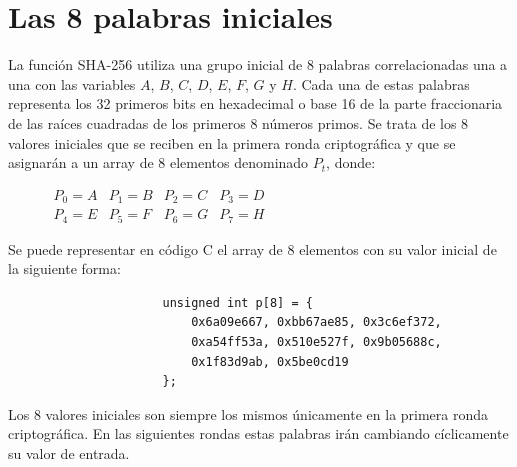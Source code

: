 \documentclass{article}
\begin{document}
\section{Las 8 palabras iniciales}
    La función SHA-256 utiliza una grupo inicial de 8 palabras correlacionadas una a una con las variables $A$, $B$, $C$, $D$, $E$, $F$, $G$ y $H$. Cada una de estas palabras representa los 32 primeros bits en hexadecimal o base 16 de la parte fraccionaria de las raíces cuadradas de los primeros 8 números primos. Se trata de los 8 valores iniciales que se reciben en la primera ronda criptográfica y que se asignarán a un array de 8 elementos denominado $P_{t}$, donde:
        \begin{figure}[H]
        \centering
            $\begin{array}{llll}
                P_{0} = A & P_{1} = B & P_{2} = C & P_{3} = D \\
                P_{4} = E & P_{5} = F & P_{6} = G & P_{7} = H
            \end{array}$
        \end{figure}
    
    Se puede representar en código C el array de 8 elementos con su valor inicial de la siguiente forma:
        \begin{figure}[H]
        \centering
            \begin{verbatim}
                unsigned int p[8] = {
                	0x6a09e667, 0xbb67ae85, 0x3c6ef372,
                	0xa54ff53a, 0x510e527f, 0x9b05688c,
                	0x1f83d9ab, 0x5be0cd19
                };
            \end{verbatim}
        \end{figure}
    
    Los 8 valores iniciales son siempre los mismos únicamente en la primera ronda criptográfica. En las siguientes rondas estas palabras irán cambiando cíclicamente su valor de entrada.
    
\end{document}
